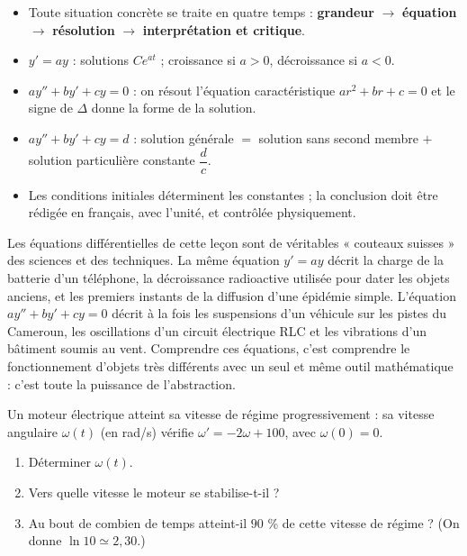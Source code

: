 \documentclass[11pt]{article}
\begin{document}
\begin{aretenir}
\begin{itemize}
\item Toute situation concrète se traite en quatre temps : \textbf{grandeur} $\to$ \textbf{équation} $\to$ \textbf{résolution} $\to$ \textbf{interprétation et critique}.
\item $y'=ay$ : solutions $Ce^{at}$ ; croissance si $a>0$, décroissance si $a<0$.
\item $ay''+by'+cy=0$ : on résout l'équation caractéristique $ar^2+br+c=0$ et le signe de $\Delta$ donne la forme de la solution.
\item $ay''+by'+cy=d$ : solution générale $=$ solution sans second membre $+$ solution particulière constante $\dfrac{d}{c}$.
\item Les conditions initiales déterminent les constantes ; la conclusion doit être rédigée en français, avec l'unité, et contrôlée physiquement.
\end{itemize}
\end{aretenir}

\begin{savaistu}
Les équations différentielles de cette leçon sont de véritables « couteaux suisses » des sciences et des techniques. La même équation $y'=ay$ décrit la charge de la batterie d'un téléphone, la décroissance radioactive utilisée pour dater les objets anciens, et les premiers instants de la diffusion d'une épidémie simple. L'équation $ay''+by'+cy=0$ décrit à la fois les suspensions d'un véhicule sur les pistes du Cameroun, les oscillations d'un circuit électrique RLC et les vibrations d'un bâtiment soumis au vent. Comprendre ces équations, c'est comprendre le fonctionnement d'objets très différents avec un seul et même outil mathématique : c'est toute la puissance de l'abstraction.
\end{savaistu}

\begin{exercice}
Un moteur électrique atteint sa vitesse de régime progressivement : sa vitesse angulaire $\omega(t)$ (en rad/s) vérifie $\omega'=-2\omega+100$, avec $\omega(0)=0$.
\begin{enumerate}
\item Déterminer $\omega(t)$.
\item Vers quelle vitesse le moteur se stabilise-t-il ?
\item Au bout de combien de temps atteint-il $90$ \% de cette vitesse de régime ? (On donne $\ln 10\simeq 2{,}30$.)
\end{enumerate}
\end{exercice}
\end{document}

